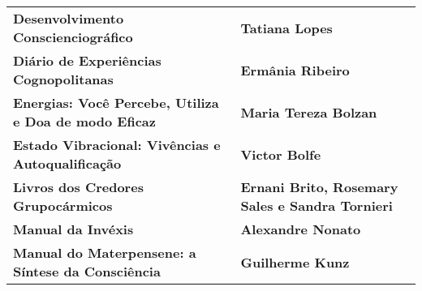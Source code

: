 \documentclass[
]{article}
\begin{document}
\begin{longtable}[]{@{}
  >{\raggedright\arraybackslash}p{}
  >{\raggedright\arraybackslash}p{}@{}}
\begin{minipage}[b]{\linewidth}
\textbf{Desenvolvimento Conscienciográfico}
\end{minipage} & \begin{minipage}[b]{\linewidth}\raggedright
\textbf{Tatiana Lopes}
\end{minipage} \\
\begin{minipage}[b]{\linewidth}\raggedright
\textbf{Diário de Experiências Cognopolitanas}
\end{minipage} & \begin{minipage}[b]{\linewidth}\raggedright
\textbf{Ermânia Ribeiro}
\end{minipage} \\
\begin{minipage}[b]{\linewidth}\raggedright
\textbf{Energias: Você Percebe, Utiliza e Doa de modo Eficaz}
\end{minipage} & \begin{minipage}[b]{\linewidth}\raggedright
\textbf{Maria Tereza Bolzan}
\end{minipage} \\
\begin{minipage}[b]{\linewidth}\raggedright
\textbf{Estado Vibracional: Vivências e Autoqualificação}
\end{minipage} & \begin{minipage}[b]{\linewidth}\raggedright
\textbf{Victor Bolfe}
\end{minipage} \\
\begin{minipage}[b]{\linewidth}\raggedright
\textbf{Livros dos Credores Grupocármicos}
\end{minipage} & \begin{minipage}[b]{\linewidth}\raggedright
\textbf{Ernani Brito, Rosemary Sales e Sandra Tornieri}
\end{minipage} \\
\begin{minipage}[b]{\linewidth}\raggedright
\textbf{Manual da Invéxis}
\end{minipage} & \begin{minipage}[b]{\linewidth}\raggedright
\textbf{Alexandre Nonato}
\end{minipage} \\
\begin{minipage}[b]{\linewidth}\raggedright
\textbf{Manual do Materpensene: a Síntese da Consciência}
\end{minipage} & \begin{minipage}[b]{\linewidth}\raggedright
\textbf{Guilherme Kunz}

\end{minipage}
\end{longtable}
\end{document}
